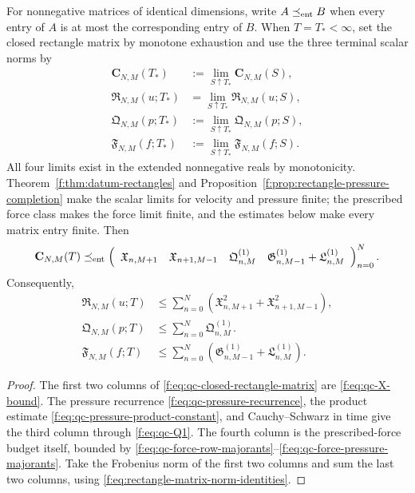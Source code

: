 \begin{proposition}
\label{f:prop:qc-closed-rectangle-matrix}
For nonnegative matrices of identical dimensions, write
\(A\preceq_{\rm ent}B\) when every entry of \(A\) is at most the
corresponding entry of \(B\).  When \(T=T_*<\infty\), set the closed
rectangle matrix by monotone exhaustion and use the three terminal scalar norms
by
\begin{align*}
 \mathbf C_{N,M}(T_*)&:=
 \lim_{S\uparrow T_*}\mathbf C_{N,M}(S),\\
 \mathfrak R_{N,M}(u;T_*)&=
 \lim_{S\uparrow T_*}\mathfrak R_{N,M}(u;S),\\
 \mathfrak Q_{N,M}(p;T_*)&:=
 \lim_{S\uparrow T_*}\mathfrak Q_{N,M}(p;S),\\
 \mathfrak F_{N,M}(f;T_*)&:=
 \lim_{S\uparrow T_*}\mathfrak F_{N,M}(f;S).
\end{align*}
All four limits exist in the extended nonnegative reals by monotonicity.
Theorem~\ref{f:thm:datum-rectangles} and
Proposition~\ref{f:prop:rectangle-pressure-completion} make the scalar limits
for velocity and pressure finite; the prescribed force class makes the force
limit finite, and the estimates below make every matrix entry finite.
Then
\begin{equation}
 \mathbf C_{N,M}(T)
 \preceq_{\rm ent}
 \left(
 \begin{array}{cccc}
  \mathfrak X_{n,M+1}
  &\mathfrak X_{n+1,M-1}
  &\mathfrak Q^{(1)}_{n,M}
  &\mathfrak G^{(1)}_{n,M-1}+\mathfrak L^{(1)}_{n,M}
 \end{array}
 \right)_{n=0}^{N}.
 \label{f:eq:qc-closed-rectangle-matrix}
\end{equation}
Consequently,
\begin{align}
 \mathfrak R_{N,M}(u;T)
 &\le\sum_{n=0}^{N}
 \left(\mathfrak X_{n,M+1}^2
       +\mathfrak X_{n+1,M-1}^2\right),
 \label{f:eq:qc-closed-rectangle-frobenius}\\
 \mathfrak Q_{N,M}(p;T)
 &\le\sum_{n=0}^{N}\mathfrak Q^{(1)}_{n,M}.
 \label{f:eq:qc-closed-pressure-column}\\
 \mathfrak F_{N,M}(f;T)
 &\le\sum_{n=0}^{N}
 \left(\mathfrak G^{(1)}_{n,M-1}+\mathfrak L^{(1)}_{n,M}\right).
 \label{f:eq:qc-closed-force-column}
\end{align}
\end{proposition}

\begin{proof}
The first two columns of \eqref{f:eq:qc-closed-rectangle-matrix} are
\eqref{f:eq:qc-X-bound}.  The pressure recurrence
\eqref{f:eq:qc-pressure-recurrence}, the product estimate
\eqref{f:eq:qc-pressure-product-constant}, and Cauchy--Schwarz in time give
the third column through \eqref{f:eq:qc-Q1}.  The fourth column is the
prescribed-force budget itself, bounded by
\eqref{f:eq:qc-force-row-majorants}--\eqref{f:eq:qc-force-pressure-majorants}.
Take the Frobenius norm of the first two columns and sum the last two columns, using
\eqref{f:eq:rectangle-matrix-norm-identities}.
\end{proof}

